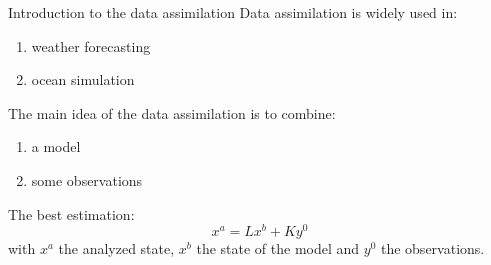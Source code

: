 \begin{frame}{Introduction to the data assimilation}
    Data assimilation is widely used in:
    \begin{enumerate}[\textbullet]
           \item weather forecasting
           \item ocean simulation
    \end{enumerate}	 
          The main idea of the data assimilation is to combine:
    \begin{enumerate}[\textbullet]
           \item a model
           \item some observations
    \end{enumerate}	 
    The best estimation:
    $$x^a=Lx^b+Ky^0$$
    with $x^a$ the analyzed state, $x^b$ the state of the model and $y^0$ the observations.
   \end{frame}
